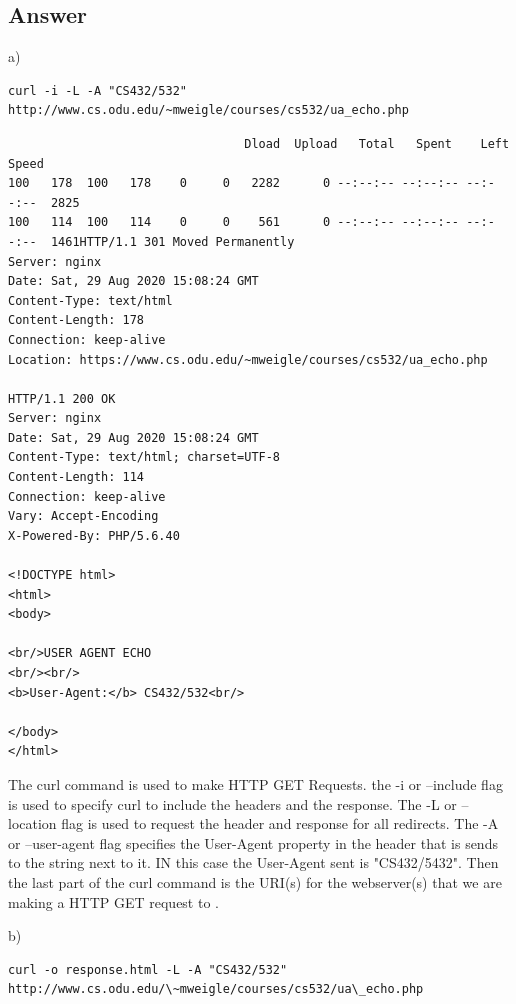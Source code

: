 \documentclass[12pt]{article}
\begin{document}
\subsection*{Answer}
a)
\begin{lstlisting}[numbers=none, caption=Command, label=lst:q2ACommand]
curl -i -L -A "CS432/532" http://www.cs.odu.edu/~mweigle/courses/cs532/ua_echo.php
\end{lstlisting}
\begin{lstlisting}[numbers=none,
		        caption={curl command to get the GET response and header, redirects and send a User-Agent header propety}, 
			label=lst:q2AResponse]
  % Total    % Received % Xferd  Average Speed   Time    Time     Time  Current
                                 Dload  Upload   Total   Spent    Left  Speed
100   178  100   178    0     0   2282      0 --:--:-- --:--:-- --:--:--  2825
100   114  100   114    0     0    561      0 --:--:-- --:--:-- --:--:--  1461HTTP/1.1 301 Moved Permanently
Server: nginx
Date: Sat, 29 Aug 2020 15:08:24 GMT
Content-Type: text/html
Content-Length: 178
Connection: keep-alive
Location: https://www.cs.odu.edu/~mweigle/courses/cs532/ua_echo.php

HTTP/1.1 200 OK
Server: nginx
Date: Sat, 29 Aug 2020 15:08:24 GMT
Content-Type: text/html; charset=UTF-8
Content-Length: 114
Connection: keep-alive
Vary: Accept-Encoding
X-Powered-By: PHP/5.6.40

<!DOCTYPE html>
<html>
<body>

<br/>USER AGENT ECHO
<br/><br/>
<b>User-Agent:</b> CS432/532<br/>

</body>
</html>
\end{lstlisting}

The curl command is used to make HTTP GET Requests. the -i  or --include flag is used to specify curl to include the headers and the response. The -L or --location flag is used to request the header 
and response for all redirects. The -A or --user-agent flag specifies the User-Agent property in the header that is sends to the string next to it. IN this case the User-Agent sent is "CS432/5432".
Then the last part of the curl command is the URI(s) for the webserver(s) that we are making a HTTP GET request to \cite{curlManPage}.

b)
\begin{lstlisting}[numbers=none, caption="curl command to get headers only for all redirects and sets the User-Agent header property", label=lst:q2BCommand]
curl -o response.html -L -A "CS432/532" http://www.cs.odu.edu/\~mweigle/courses/cs532/ua\_echo.php
\end{lstlisting}
\end{document}

